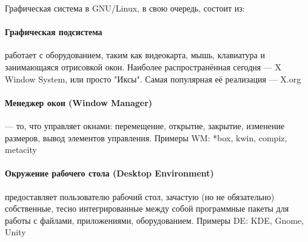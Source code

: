 Графическая система в GNU/Linux, в свою очередь, состоит из:

\paragraph{Графическая подсистема} работает с оборудованием, таким как видеокарта, мышь, клавиатура и занимающаяся отрисовкой окон. Наиболее распространённая сегодня --- X Window System, или просто "Иксы". Самая популярная её реализация --- X.org

\paragraph{Менеджер окон (Window Manager)} --- то, что управляет окнами: перемещение, открытие, закрытие, изменение размеров, вывод элементов управления. Примеры WM: *box, kwin, compiz, metacity

\paragraph{Окружение рабочего стола (Desktop Environment)} предоставляет пользователю рабочий стол, зачастую (но не обязательно) собственные, тесно интегрированные между собой программные пакеты для работы с файлами, приложениями, оборудованием. Примеры DE: KDE, Gnome, Unity